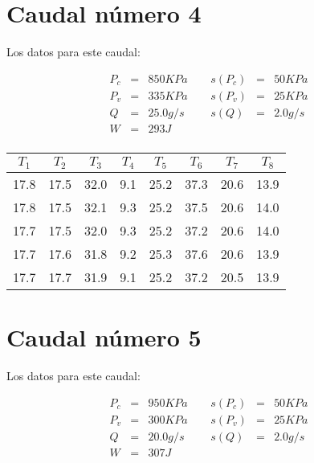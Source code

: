 \documentclass[12pt,a4paper]{article}
\begin{document}
 
\section{Caudal número 4} 
 
Los datos para este caudal:  
 
\begin{equation} 
\begin{array}{lllllll}
P_c & = & 850 KPa &  \ \ &  s(P_c) & =  & 50  KPa \\ 
 P_v & = & 335 KPa &  \ \ &  s(P_v) & =  & 25  KPa\\ 
 Q & = & 25.0 g/s &  \ \ &  s(Q) & =  & 2.0  g/s \\ 
 W & = & 293 J & & & & \\ 
\end{array} 
\end{equation} 
 
\begin{table}[h!] 	 \centering 
\begin{tabular}{|c|c|c|c|c|c|c|c|} 
\hline 
$T_1$ & $T_2$ & $T_3$ & $T_4$ & $T_5$ & $T_6$ & $T_7$ & $T_8$ \\ \hline 
17.8 & 17.5 & 32.0 & 9.1 & 25.2 & 37.3 & 20.6 & 13.9  \\  
17.8 & 17.5 & 32.1 & 9.3 & 25.2 & 37.5 & 20.6 & 14.0  \\  
17.7 & 17.5 & 32.0 & 9.3 & 25.2 & 37.2 & 20.6 & 14.0  \\  
17.7 & 17.6 & 31.8 & 9.2 & 25.3 & 37.6 & 20.6 & 13.9  \\  
17.7 & 17.7 & 31.9 & 9.1 & 25.2 & 37.2 & 20.5 & 13.9  \\  
\hline 
\end{tabular} 
\label{tab:regresion4} 
\end{table} 
 
 
\section{Caudal número 5} 
 
Los datos para este caudal:  
 
\begin{equation} 
\begin{array}{lllllll}
P_c & = & 950 KPa &  \ \ &  s(P_c) & =  & 50  KPa \\ 
 P_v & = & 300 KPa &  \ \ &  s(P_v) & =  & 25  KPa\\ 
 Q & = & 20.0 g/s &  \ \ &  s(Q) & =  & 2.0  g/s \\ 
 W & = & 307 J & & & & \\ 
\end{array} 
\end{equation} 
 
\end{document}
